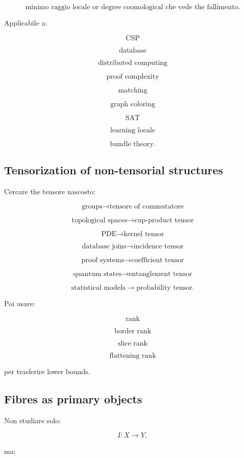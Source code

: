 \documentclass[11pt]{article}
\begin{document}
\[
\text{minimo raggio locale or degree coomological che vede the fallimento.}
\]

Applicabile a:

\[
\text{CSP}
\]

\[
\text{database}
\]

\[
\text{distributed computing}
\]

\[
\text{proof complexity}
\]

\[
\text{matching}
\]

\[
\text{graph coloring}
\]

\[
\text{SAT}
\]

\[
\text{learning locale}
\]

\[
\text{bundle theory}.
\]



\subsection{Tensorization of non-tensorial structures}

Cercare the tensore nascosto:

\[
\text{groups}\to \text{tensore of commutatore}
\]

\[
\text{topological spaces}\to \text{cup-product tensor}
\]

\[
\text{PDE}\to \text{kernel tensor}
\]

\[
\text{database joins}\to \text{incidence tensor}
\]

\[
\text{proof systems}\to \text{coefficient tensor}
\]

\[
\text{quantum states}\to \text{entanglement tensor}
\]

\[
\text{statistical models}\to \text{probability tensor}.
\]

Poi usare:

\[
\text{rank}
\]

\[
\text{border rank}
\]

\[
\text{slice rank}
\]

\[
\text{flattening rank}
\]

per trasferire lower bounds.



\subsection{Fibres as primary objects}

Non studiare solo:

\[
I:X\to Y,
\]

ma:
\end{document}
